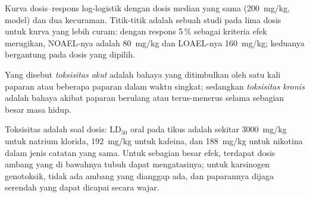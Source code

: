\begin{omfigure}

{\small Kurva dosis--respons log-logistik dengan dosis median yang sama (\qty{200}{mg/kg},
model) dan dua kecuraman. Titik-titik adalah sebuah studi pada lima dosis untuk kurva
yang lebih curam: dengan respons 5\,\% sebagai kriteria efek merugikan, NOAEL-nya adalah
\qty{80}{mg/kg} dan LOAEL-nya \qty{160}{mg/kg}; keduanya bergantung pada dosis yang dipilih.}
\end{omfigure}

\begin{definition}\label{def:b3:environmental-toxicology:toxicity}
Yang disebut \emph{toksisitas akut} adalah bahaya yang ditimbulkan oleh satu kali
paparan atau beberapa paparan dalam waktu singkat; sedangkan \emph{toksisitas kronis}
adalah bahaya akibat paparan berulang atau terus-menerus selama sebagian besar masa hidup.
\end{definition}

Toksisitas adalah soal dosis: $\mathrm{LD_{50}}$ oral pada tikus adalah sekitar \qty{3000}{mg/kg} untuk natrium klorida,
\qty{192}{mg/kg} untuk kafeina, dan \qty{188}{mg/kg} untuk nikotina dalam jenis catatan yang sama. Untuk sebagian besar efek,
terdapat dosis ambang yang di bawahnya tubuh dapat mengatasinya; untuk karsinogen genotoksik,
tidak ada ambang yang dianggap ada, dan paparannya dijaga serendah yang dapat dicapai secara wajar.

